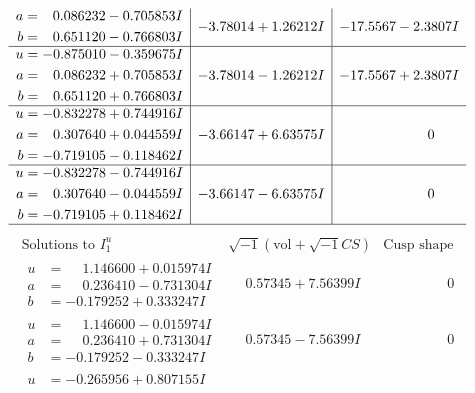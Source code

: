\documentclass[1p]{elsarticle_modified}
\theoremstyle{definition}
\newcommand{\I}{\sqrt{-1}}
\begin{document}
$$\begin{array}{c|c|c}
\begin{aligned}
a &= \phantom{-}0.086232 - 0.705853 I \\
b &= \phantom{-}0.651120 - 0.766803 I\end{aligned}
 & -3.78014 + 1.26212 I & -17.5567 - 2.3807 I \\ \hline\begin{aligned}
u &= -0.875010 - 0.359675 I \\
a &= \phantom{-}0.086232 + 0.705853 I \\
b &= \phantom{-}0.651120 + 0.766803 I\end{aligned}
 & -3.78014 - 1.26212 I & -17.5567 + 2.3807 I \\ \hline\begin{aligned}
u &= -0.832278 + 0.744916 I \\
a &= \phantom{-}0.307640 + 0.044559 I \\
b &= -0.719105 - 0.118462 I\end{aligned}
 & -3.66147 + 6.63575 I & \phantom{-0.000000 } 0 \\ \hline\begin{aligned}
u &= -0.832278 - 0.744916 I \\
a &= \phantom{-}0.307640 - 0.044559 I \\
b &= -0.719105 + 0.118462 I\end{aligned}
 & -3.66147 - 6.63575 I & \phantom{-0.000000 } 0\\
 \hline 
 \end{array}$$\newpage$$\begin{array}{c|c|c}  
\text{Solutions to }I^u_{1}& \I (\text{vol} + \sqrt{-1}CS) & \text{Cusp shape}\\
 \hline 
\begin{aligned}
u &= \phantom{-}1.146600 + 0.015974 I \\
a &= \phantom{-}0.236410 - 0.731304 I \\
b &= -0.179252 + 0.333247 I\end{aligned}
 & \phantom{-}0.57345 + 7.56399 I & \phantom{-0.000000 } 0 \\ \hline\begin{aligned}
u &= \phantom{-}1.146600 - 0.015974 I \\
a &= \phantom{-}0.236410 + 0.731304 I \\
b &= -0.179252 - 0.333247 I\end{aligned}
 & \phantom{-}0.57345 - 7.56399 I & \phantom{-0.000000 } 0 \\ \hline\begin{aligned}
u &= -0.265956 + 0.807155 I \\

\end{aligned}
\end{array}$$
\end{document}
